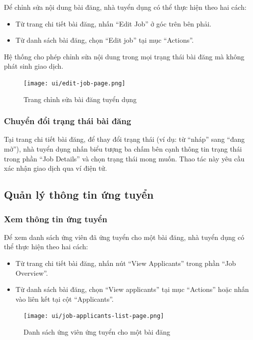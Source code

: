 Để chỉnh sửa nội dung bài đăng, nhà tuyển dụng có thể thực hiện theo hai cách:
\begin{itemize}
  \item Từ trang chi tiết bài đăng, nhấn ``Edit Job'' ở góc trên bên phải.
  \item Từ danh sách bài đăng, chọn ``Edit job'' tại mục ``Actions''.
\end{itemize}

Hệ thống cho phép chỉnh sửa nội dung trong mọi trạng thái bài đăng mà không phát sinh giao dịch.

\begin{figure}[H]
  \centering
  \texttt{[image: ui/edit-job-page.png]}
  \caption{Trang chỉnh sửa bài đăng tuyển dụng}
  \label{fig:edit-job-page}
\end{figure}

\subsubsection{Chuyển đổi trạng thái bài đăng}

Tại trang chi tiết bài đăng, để thay đổi trạng thái (ví dụ: từ ``nháp'' sang ``đang mở''), nhà tuyển dụng nhấn biểu tượng ba chấm bên cạnh thông tin trạng thái trong phần ``Job Details'' và chọn trạng thái mong muốn.  
Thao tác này yêu cầu xác nhận giao dịch qua ví điện tử.

\subsection{Quản lý thông tin ứng tuyển}

\subsubsection{Xem thông tin ứng tuyển}

Để xem danh sách ứng viên đã ứng tuyển cho một bài đăng, nhà tuyển dụng có thể thực hiện theo hai cách:
\begin{itemize}
  \item Từ trang chi tiết bài đăng, nhấn nút ``View Applicants'' trong phần ``Job Overview''.
  \item Từ danh sách bài đăng, chọn ``View applicants'' tại mục ``Actions'' hoặc nhấn vào liên kết tại cột ``Applicants''.
\end{itemize}

\begin{figure}[H]
  \centering
  \texttt{[image: ui/job-applicants-list-page.png]}
  \caption{Danh sách ứng viên ứng tuyển cho một bài đăng}
  \label{fig:job-applicants-list-page}
\end{figure}

